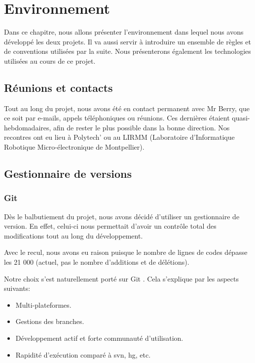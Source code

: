 \chapter{Environnement}

Dans ce chapitre, nous allons présenter l'environnement dans lequel nous avons
développé les deux projets. Il va aussi servir à introduire un ensemble de
règles et de conventions utilisées par la suite.
Nous présenterons également les technologies utilisées au cours de ce projet.


    \section{Réunions et contacts}
Tout au long du projet, nous avons été en contact permanent avec Mr Berry,
que ce soit par e-mails, appels téléphoniques ou réunions. Ces dernières
étaient quasi-hebdomadaires, afin de rester le plus possible dans la
bonne direction. Nos recontres ont eu lieu à Polytech' ou au LIRMM (Laboratoire d'Informatique Robotique Micro-électronique de Montpellier).

    \section{Gestionnaire de versions}

        \subsection{Git}
Dès le balbutiement du projet, nous avons décidé d'utiliser un gestionnaire
de version. En effet, celui-ci nous permettait d'avoir un contrôle total des modifications
tout au long du développement.

Avec le recul, nous avons eu raison puisque le nombre de lignes de codes dépasse 
les 21 000 (actuel, pas le nombre d'additions et de délétions).

Notre choix s'est naturellement porté sur Git \cite{git}. Cela s'explique 
par les aspects suivants:

    \begin{itemize}
    \item Multi-plateformes.
    \item Gestions des branches.
    \item Développement actif et forte communauté d'utilisation.
    \item Rapidité d'exécution comparé à svn, hg, etc. 
    \end{itemize}

